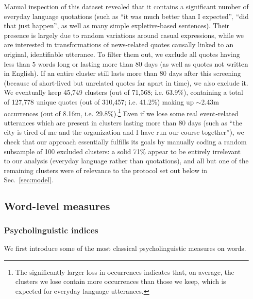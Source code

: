 Manual inspection of this dataset revealed that it contains a significant number of everyday language quotations (such as ``it was much better than I expected'', ``did that just happen'', as well as many simple expletive-based sentences).
Their presence is largely due to random variations around casual expressions, while we are interested in transformations of news-related quotes causally linked to an original, identifiable utterance.
To filter them out, we exclude all quotes having less than 5 words long or lasting more than 80 days %
 (as well as quotes not written in English). If an entire cluster still lasts more than 80 days after this screening (because of short-lived but unrelated quotes far apart in time), we also exclude it.
We eventually keep 45,749 clusters (out of 71,568; i.e. 63.9\%), containing a total of 127,778 unique quotes (out of 310,457; i.e. 41.2\%) making up $\sim$2.43m occurrences (out of 8.16m, i.e. 29.8\%).\footnote{The significantly larger loss in occurrences indicates that, on average, the clusters we lose contain more occurrences than those we keep, which is expected for everyday language utterances.}
Even if we lose some real event-related utterances which are present in clusters lasting more than 80 days (such as ``the city is tired of me and the organization and I have run our course together''), we check that our approach essentially fulfills its goals by manually coding a random subsample of 100 excluded clusters: a solid 71\% appear to be entirely irrelevant to our analysis (everyday language rather than quotations), and all but one of the remaining clusters were of relevance to the protocol set out below in Sec.~\ref{sec:model}.


\subsection{Word-level measures}

\subsubsection{Psycholinguistic indices}

We first introduce some of the most classical psycholinguistic measures on words.

